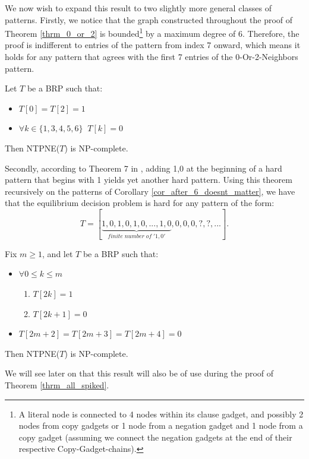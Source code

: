 \documentclass[runningheads]{llncs}
\begin{document}
We now wish to expand this result to two slightly more general classes of patterns.
Firstly, we notice that the graph constructed throughout the proof of Theorem \ref{thrm_0_or_2} is bounded\footnote{A literal node is connected to 4 nodes within its clause gadget, and possibly 2 nodes from copy gadgets or 1 node from a negation gadget and 1 node from a copy gadget (assuming we connect the negation gadgets at the end of their respective Copy-Gadget-chains).} by a maximum degree of 6. Therefore, the proof is indifferent to entries of the pattern from index 7 onward, which means it holds for any pattern that agrees with the first 7 entries of the 0-Or-2-Neighbors pattern.

\begin{corollary}
\label{cor_after_6_doesnt_matter}
Let $T$ be a BRP such that:
\begin{itemize}
    \item $T[0]=T[2]=1$
    \item $\forall k\in \{1,3,4,5,6\} \;\; T[k]=0$
\end{itemize}
Then NTPNE($T$) is NP-complete.
\end{corollary}

Secondly, according to Theorem 7 in \cite{Gilboa_Nisan_public_goods}, adding 1,0 at the beginning of a hard pattern that begins with 1 yields yet another hard pattern. Using this theorem recursively on the patterns of Corollary \ref{cor_after_6_doesnt_matter}, we have that the equilibrium decision problem is hard for any pattern of the form:
\[T=[\underbrace{1,0,1,0,1,0,...,1,0}_{finite\;number\;of\;'1,0'},0,0,0,?,?,...].\]

\begin{corollary}
\label{cor_alternating}
Fix $m\geq 1$, and let $T$ be a BRP such that:
\begin{itemize}
    \item $\forall 0\leq k\leq m$ 
    \begin{enumerate}
      \item $T[2k]=1$
      \item $T[2k+1]=0$
    \end{enumerate}
    \item $T[2m+2]=T[2m+3]=T[2m+4]=0$    
\end{itemize}
Then NTPNE($T$) is NP-complete.
\end{corollary}

We will see later on that this result will also be of use during the proof of Theorem \ref{thrm_all_spiked}.
\end{document}
